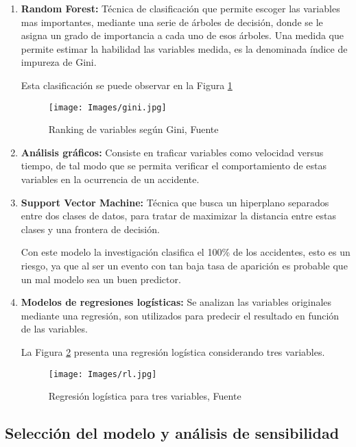 \documentclass{article}
\begin{document}
\begin{enumerate}

\item \textbf{Random Forest:} Técnica de clasificación que permite escoger las variables mas importantes, mediante una serie de árboles de decisión, donde se le asigna un grado de importancia a cada uno de esos árboles. Una medida que permite estimar la habilidad las variables medida, es la denominada índice de impureza de Gini.

Esta clasificación se puede observar en la Figura \ref{gini}

\begin{figure}[H]
\texttt{[image: Images/gini.jpg]}
\centering
\caption{Ranking de variables según Gini, Fuente \cite{article1}}
\label{gini}
\end{figure}

\item \textbf{Análisis gráficos:} Consiste en traficar variables como velocidad versus tiempo, de tal modo que se permita verificar el comportamiento de estas variables en la ocurrencia de un accidente.

\item \textbf{Support Vector Machine:} Técnica que busca un hiperplano separados entre dos clases de datos, para tratar de maximizar la distancia entre estas clases y una frontera de decisión.

Con este modelo la investigación clasifica el 100\% de los accidentes, esto es un riesgo, ya que al ser un evento con tan baja tasa de aparición es probable que un mal modelo sea un buen predictor.

\item \textbf{Modelos de regresiones logísticas:} Se analizan las variables originales mediante una regresión, son utilizados para predecir el resultado en función de las variables.

La Figura \ref{rl} presenta una regresión logística considerando tres variables. 

\begin{figure}[H]
\texttt{[image: Images/rl.jpg]}
\centering
\caption{Regresión logística para tres variables, Fuente \cite{article1}}
\label{rl}
\end{figure}

\end{enumerate}

\subsection{Selección del modelo y análisis de sensibilidad}
\end{document}
